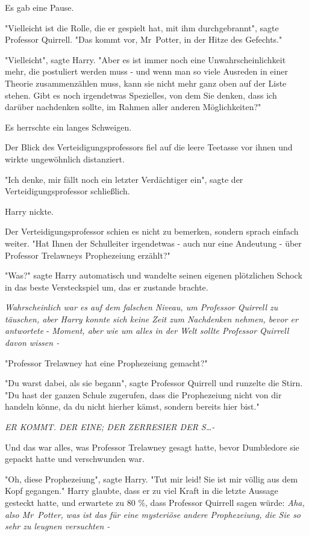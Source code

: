 {Es gab eine Pause.

"Vielleicht ist die Rolle, die er gespielt hat, mit ihm durchgebrannt", sagte Professor Quirrell. "Das kommt vor, Mr~Potter, in der Hitze des Gefechts."

"Vielleicht", sagte Harry. "Aber es ist immer noch eine Unwahrscheinlichkeit mehr, die postuliert werden muss - und wenn man so viele Ausreden in einer Theorie zusammenzählen muss, kann sie nicht mehr ganz oben auf der Liste stehen. Gibt es noch irgendetwas Spezielles, von dem Sie denken, dass ich darüber nachdenken sollte, im Rahmen aller anderen Möglichkeiten?"

Es herrschte ein langes Schweigen.

Der Blick des Verteidigungsprofessors fiel auf die leere Teetasse vor ihnen und wirkte ungewöhnlich distanziert.

"Ich denke, mir fällt noch ein letzter Verdächtiger ein", sagte der Verteidigungsprofessor schließlich.

Harry nickte.

Der Verteidigungsprofessor schien es nicht zu bemerken, sondern sprach einfach weiter. "Hat Ihnen der Schulleiter irgendetwas - auch nur eine Andeutung - über Professor Trelawneys Prophezeiung erzählt?"

"Was?" sagte Harry automatisch und wandelte seinen eigenen plötzlichen Schock in das beste Versteckspiel um, das er zustande brachte.

\emph{Wahrscheinlich war es auf dem falschen Niveau, um Professor Quirrell zu täuschen, aber Harry konnte sich keine Zeit zum Nachdenken nehmen, bevor er antwortete} - \emph{Moment, aber wie um alles in der Welt sollte Professor Quirrell davon wissen -}

"Professor Trelawney hat eine Prophezeiung gemacht?"

"Du warst dabei, als sie begann", sagte Professor Quirrell und runzelte die Stirn. "Du hast der ganzen Schule zugerufen, dass die Prophezeiung nicht von dir handeln könne, da du nicht hierher kämst, sondern bereits hier bist."

\emph{ER KOMMT. DER EINE; DER ZERRESIER DER S…-}

Und das war alles, was Professor Trelawney gesagt hatte, bevor Dumbledore sie gepackt hatte und verschwunden war.

"Oh, diese Prophezeiung", sagte Harry. "Tut mir leid! Sie ist mir völlig aus dem Kopf gegangen." Harry glaubte, dass er zu viel Kraft in die letzte Aussage gesteckt hatte, und erwartete zu 80 \%, dass Professor Quirrell sagen würde: \emph{Aha, also Mr~Potter, was ist das für eine mysteriöse andere Prophezeiung, die Sie so sehr zu leugnen versuchten -}

}
